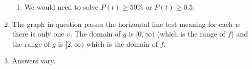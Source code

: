 \begin{enumerate}
\begin{enumerate}
\item  We would need to solve $P(t) \geq 50 \%$ or $P(t) \geq 0.5$.

\end{enumerate}


\item The graph in question passes the horizontal line test meaning for each $w$ there is only one $v$.    The domain of $g$ is $[0, \infty)$ (which is the range of $f$) and the range of $g$ is $[2, \infty)$ which is the domain of $f$.  

\item  Answers vary.  

\end{enumerate}
